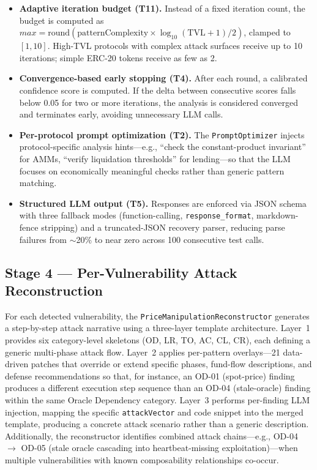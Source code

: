\documentclass[10pt]{article}
\begin{document}
\begin{itemize}
    \item \textbf{Adaptive iteration budget (T11).} Instead of a fixed iteration count, the budget is computed as $max = \mathrm{round}(\text{patternComplexity} \times \log_{10}(\text{TVL} + 1) / 2)$, clamped to $[1, 10]$. High-TVL protocols with complex attack surfaces receive up to 10 iterations; simple ERC-20 tokens receive as few as 2.
    \item \textbf{Convergence-based early stopping (T4).} After each round, a calibrated confidence score is computed. If the delta between consecutive scores falls below 0.05 for two or more iterations, the analysis is considered converged and terminates early, avoiding unnecessary LLM calls.
    \item \textbf{Per-protocol prompt optimization (T2).} The \texttt{PromptOptimizer} injects protocol-specific analysis hints---e.g., ``check the constant-product invariant'' for AMMs, ``verify liquidation thresholds'' for lending---so that the LLM focuses on economically meaningful checks rather than generic pattern matching.
    \item \textbf{Structured LLM output (T5).} Responses are enforced via JSON schema with three fallback modes (function-calling, \texttt{response\_format}, markdown-fence stripping) and a truncated-JSON recovery parser, reducing parse failures from $\sim$20\% to near zero across 100 consecutive test calls.
\end{itemize}

\subsection{Stage 4 --- Per-Vulnerability Attack Reconstruction}
For each detected vulnerability, the \texttt{PriceManipulationReconstructor} generates a step-by-step attack narrative using a three-layer template architecture. Layer~1 provides six category-level skeletons (OD, LR, TO, AC, CL, CR), each defining a generic multi-phase attack flow. Layer~2 applies per-pattern overlays---21 data-driven patches that override or extend specific phases, fund-flow descriptions, and defense recommendations so that, for instance, an OD-01 (spot-price) finding produces a different execution step sequence than an OD-04 (stale-oracle) finding within the same Oracle Dependency category. Layer~3 performs per-finding LLM injection, mapping the specific \texttt{attackVector} and code snippet into the merged template, producing a concrete attack scenario rather than a generic description. Additionally, the reconstructor identifies combined attack chains---e.g., OD-04 $\rightarrow$ OD-05 (stale oracle cascading into heartbeat-missing exploitation)---when multiple vulnerabilities with known composability relationships co-occur.
\end{document}
